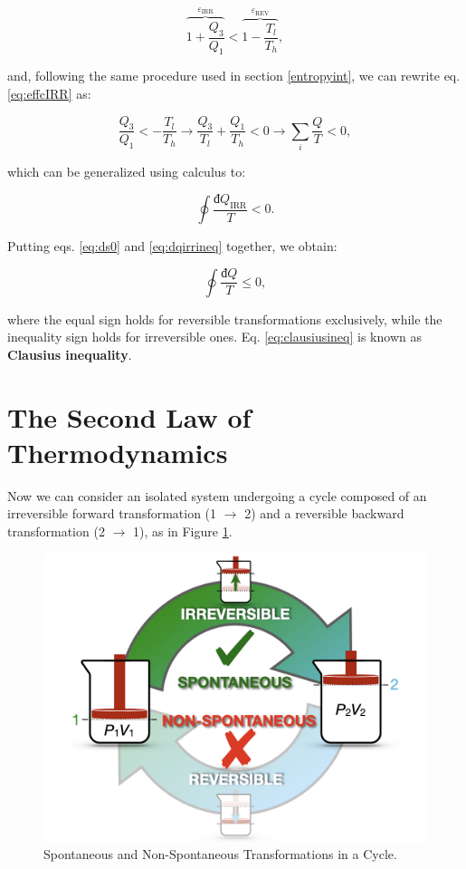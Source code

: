 \documentclass[
  9pt,
]{extbook}
\theoremstyle{definition}
\theoremstyle{definition}
\theoremstyle{definition}
\theoremstyle{remark}
\begin{document}
\begin{equation}
\overbrace{1+\frac{Q_3}{Q_1}}^{\varepsilon_{\mathrm{IRR}}} < \overbrace{1-\frac{T_l}{T_h}}^{\varepsilon_{\mathrm{REV}}},
\label{eq:effcIRR}
\end{equation}

and, following the same procedure used in section \ref{entropyint}, we can rewrite eq. \eqref{eq:effcIRR} as:

\begin{equation}
\frac{Q_3}{Q_1} < - \frac{T_l}{T_h} \longrightarrow \frac{Q_3}{T_l} + \frac{Q_1}{T_h} < 0 \longrightarrow \sum_i \frac{Q}{T} < 0,
\label{eq:effcIRR2}
\end{equation}

which can be generalized using calculus to:

\begin{equation}
\oint \frac{đQ_{\mathrm{IRR}}}{T} < 0.
\label{eq:dqirrineq}
\end{equation}

Putting eqs. \eqref{eq:ds0} and \eqref{eq:dqirrineq} together, we obtain:

\begin{equation}
\oint \frac{đQ}{T} \leq 0,
\label{eq:clausiusineq}
\end{equation}

where the equal sign holds for reversible transformations exclusively, while the inequality sign holds for irreversible ones. Eq. \eqref{eq:clausiusineq} is known as \textbf{Clausius inequality}.

\hypertarget{secondlaw}{%
\section{The Second Law of Thermodynamics}\label{secondlaw}}

Now we can consider an isolated system undergoing a cycle composed of an irreversible forward transformation (1 \(\rightarrow\) 2) and a reversible backward transformation (2 \(\rightarrow\) 1), as in Figure \ref{fig:FigJexpC2}.

\begin{figure}

{\centering \includegraphics[width=0.8\linewidth]{./img/OEP_Figures.011} 

}

\caption{Spontaneous and Non-Spontaneous Transformations in a Cycle.}\label{fig:FigJexpC2}
\end{figure}
\end{document}
